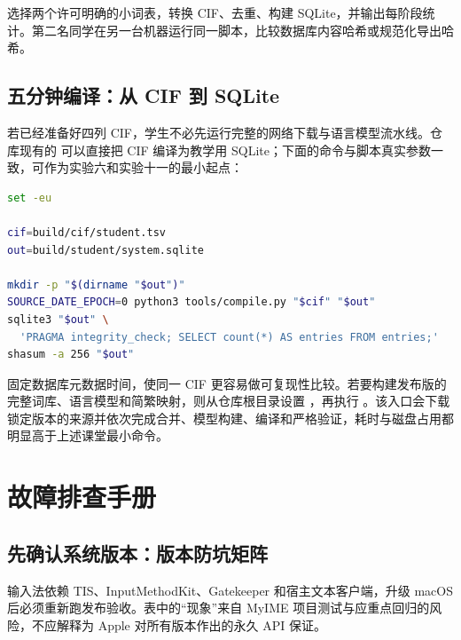 \begin{lab}[小型词库构建]
选择两个许可明确的小词表，转换 CIF、去重、构建 SQLite，并输出每阶段统计。第二名同学在另一台机器运行同一脚本，比较数据库内容哈希或规范化导出哈希。
\end{lab}

\section{五分钟编译：从 CIF 到 SQLite}

若已经准备好四列 CIF，学生不必先运行完整的网络下载与语言模型流水线。仓库现有的  可以直接把 CIF 编译为教学用 SQLite；下面的命令与脚本真实参数一致，可作为实验六和实验十一的最小起点：

\begin{lstlisting}[language=bash,caption={从 CIF 编译并检查教学词库}]
set -eu

cif=build/cif/student.tsv
out=build/student/system.sqlite

mkdir -p "$(dirname "$out")"
SOURCE_DATE_EPOCH=0 python3 tools/compile.py "$cif" "$out"
sqlite3 "$out" \
  'PRAGMA integrity_check; SELECT count(*) AS entries FROM entries;'
shasum -a 256 "$out"
\end{lstlisting}

 固定数据库元数据时间，使同一 CIF 更容易做可复现性比较。若要构建发布版的完整词库、语言模型和简繁映射，则从仓库根目录设置 ，再执行 。该入口会下载锁定版本的来源并依次完成合并、模型构建、编译和严格验证，耗时与磁盘占用都明显高于上述课堂最小命令。


\chapter{故障排查手册}

\section{先确认系统版本：版本防坑矩阵}

输入法依赖 TIS、InputMethodKit、Gatekeeper 和宿主文本客户端，升级 macOS 后必须重新跑发布验收。表中的“现象”来自 MyIME 项目测试与应重点回归的风险，不应解释为 Apple 对所有版本作出的永久 API 保证。

